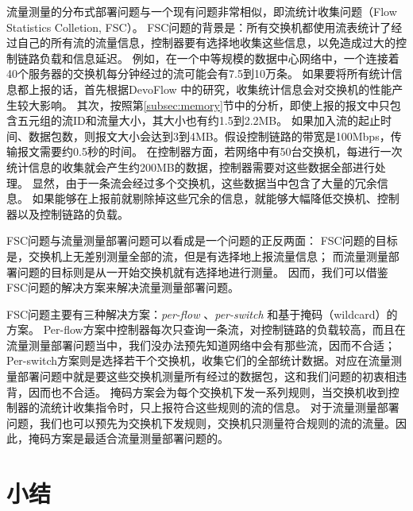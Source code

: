 流量测量的分布式部署问题与一个现有问题非常相似，即流统计收集问题（Flow Statistics Colletion, FSC）。
FSC问题的背景是：所有交换机都使用流表统计了经过自己的所有流的流量信息，控制器要有选择地收集这些信息，以免造成过大的控制链路负载和信息延迟。
例如，在一个中等规模的数据中心网络中\cite{kannan2013compact}，一个连接着40个服务器的交换机每分钟经过的流可能会有7.5到10万条。
如果要将所有统计信息都上报的话，首先根据DevoFlow \cite{curtis2011devoflow}中的研究，收集统计信息会对交换机的性能产生较大影响。
其次，按照第\ref{subsec:memory}节中的分析，即使上报的报文中只包含五元组的流ID和流量大小，其大小也有约1.5到2.2MB。
如果加入流的起止时间、数据包数，则报文大小会达到3到4MB。假设控制链路的带宽是100Mbps，传输报文需要约0.5秒的时间。
在控制器方面，若网络中有50台交换机，每进行一次统计信息的收集就会产生约200MB的数据，控制器需要对这些数据全部进行处理。
显然，由于一条流会经过多个交换机，这些数据当中包含了大量的冗余信息。
如果能够在上报前就剔除掉这些冗余的信息，就能够大幅降低交换机、控制器以及控制链路的负载。

FSC问题与流量测量部署问题可以看成是一个问题的正反两面：
FSC问题的目标是，交换机上无差别测量全部的流，但是有选择地上报流量信息；
而流量测量部署问题的目标则是从一开始交换机就有选择地进行测量。
因而，我们可以借鉴FSC问题的解决方案来解决流量测量部署问题。

FSC问题主要有三种解决方案：\emph{per-flow} \cite{van2014opennetmon}、\emph{per-switch} \cite{su2014flowcover}\cite{su2015cemon}和基于掩码（wildcard）的方案\cite{xu2017miniming}。
Per-flow方案中控制器每次只查询一条流，对控制链路的负载较高，而且在流量测量部署问题当中，我们没办法预先知道网络中会有那些流，因而不合适；
Per-switch方案则是选择若干个交换机，收集它们的全部统计数据。对应在流量测量部署问题中就是要这些交换机测量所有经过的数据包，这和我们问题的初衷相违背，因而也不合适。
掩码方案会为每个交换机下发一系列规则，当交换机收到控制器的流统计收集指令时，只上报符合这些规则的流的信息。
对于流量测量部署问题，我们也可以预先为交换机下发规则，交换机只测量符合规则的流的流量。因此，掩码方案是最适合流量测量部署问题的。



\section{小结}

